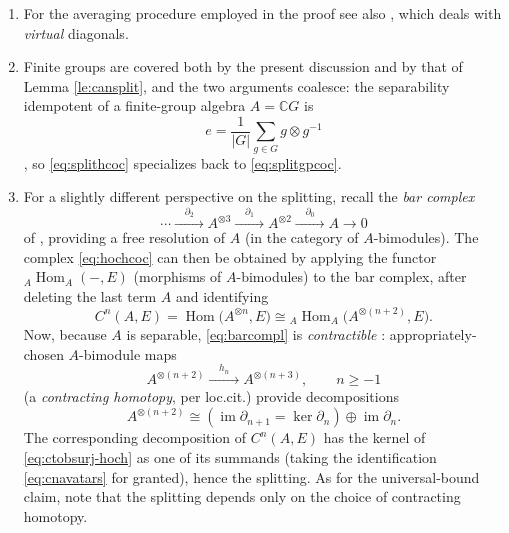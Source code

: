 \documentclass[10pt,a4paper]{amsart}
\numberwithin{equation}{section}
\newcommand\bC{{\mathbb C}}
\DeclareMathOperator{\Hom}{\mathrm{Hom}}
\DeclareMathOperator{\im}{\mathrm{im}}
\begin{document}
\begin{Remarks}\quad
 \begin{enumerate}[(1)]\itemsep=0pt
 \item For the averaging procedure employed in the proof see also \cite[Section~3]{cg-average}, which deals with {\it virtual} diagonals.


 \item Finite groups are covered both by the present discussion and by that of Lemma \ref{le:cansplit}, and the two arguments coalesce: the separability idempotent of a finite-group algebra $A=\bC G$ is
 \begin{equation*}
 e = \frac 1{|G|}\sum_{g\in G}g\otimes g^{-1}
 \end{equation*}
 \cite[Exercise 2.2.1]{run-lec}, so \eqref{eq:splithcoc} specializes back to \eqref{eq:splitgpcoc}.

 \item For a slightly different perspective on the splitting, recall the {\it bar complex}
 \begin{equation}\label{eq:barcompl}
 \cdots
 \xrightarrow{\quad \partial_2\quad}
 A^{\otimes 3}
 \xrightarrow{\quad \partial_1\quad}
 A^{\otimes 2}
 \xrightarrow{\quad \partial_0\quad}
 A\to 0
 \end{equation}
 of \cite[Definition 4.2.1]{ginz-ncg}, providing a free resolution of $A$ (in the category of $A$-bimodules). The complex \eqref{eq:hochcoc} can then be obtained by applying the functor ${}_A\Hom_{A}(-,E)$ (morphisms of $A$-bimodules) to the bar complex, after deleting the last term $A$ and identifying
 \begin{equation}\label{eq:cnavatars}
 C^n(A,E) = \Hom\big(A^{\otimes n},E\big)\cong {}_A\Hom_{A}\big(A^{\otimes (n+2)},E\big).
 \end{equation}
 Now, because $A$ is separable, \eqref{eq:barcompl} is {\it contractible} \cite[Definition following Theorem 6.14]{rot}: appropriately-chosen $A$-bimodule maps
 \begin{equation*}
 A^{\otimes(n+2)}\xrightarrow{\quad h_n\quad} A^{\otimes(n+3)},\qquad n\ge -1
 \end{equation*}
 (a {\it contracting homotopy}, per loc.cit.) provide decompositions
 \begin{equation*}
 A^{\otimes(n+2)} \cong \left(\im\partial_{n+1} = \ker\partial_n\right)\oplus \im\partial_n.
 \end{equation*}
 The corresponding decomposition of $C^n(A,E)$ has the kernel of \eqref{eq:ctobsurj-hoch} as one of its summands (taking the identification \eqref{eq:cnavatars} for granted), hence the splitting. As for the universal-bound claim, note that the splitting depends only on the choice of contracting homotopy.
 \end{enumerate}
\end{Remarks}
\end{document}
